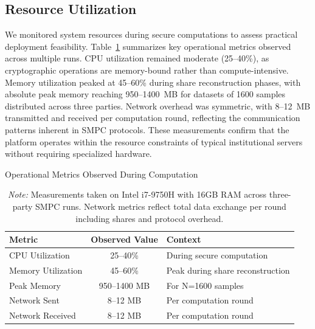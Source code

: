 \documentclass[conference]{IEEEtran}
\renewcommand{\arraystretch}{1.6} %
\begin{document}
\subsection{Resource Utilization}
We monitored system resources during secure computations to assess practical deployment feasibility. Table~\ref{tab:ops} summarizes key operational metrics observed across multiple runs. CPU utilization remained moderate (25--40\%), as cryptographic operations are memory-bound rather than compute-intensive. Memory utilization peaked at 45--60\% during share reconstruction phases, with absolute peak memory reaching 950--1400~MB for datasets of 1600 samples distributed across three parties. Network overhead was symmetric, with 8--12~MB transmitted and received per computation round, reflecting the communication patterns inherent in SMPC protocols. These measurements confirm that the platform operates within the resource constraints of typical institutional servers without requiring specialized hardware.


\begin{table}[H]
\centering
\captionsetup{justification=justified,font=footnotesize}
\caption{Operational Metrics Observed During Computation}
\label{tab:ops}
\vspace{0.3em}
\renewcommand{\arraystretch}{1.4}
\begin{adjustbox}{max width=\columnwidth}
\begin{tabular}{|l|c|p{4.2cm}|}
\hline
\textbf{Metric} & \textbf{Observed Value} & \textbf{Context} \\
\hline
CPU Utilization & 25--40\% & During secure computation \\
Memory Utilization & 45--60\% & Peak during share reconstruction \\
Peak Memory & 950--1400 MB & For N=1600 samples \\
Network Sent & 8--12 MB & Per computation round \\
Network Received & 8--12 MB & Per computation round \\
\hline
\end{tabular}
\end{adjustbox}
\vspace{0.2em}
\captionsetup{justification=justified,font=footnotesize}
\caption*{\textit{Note:} Measurements taken on Intel i7-9750H with 16GB RAM across three-party SMPC runs. Network metrics reflect total data exchange per round including shares and protocol overhead.}
\end{table}
\end{document}
